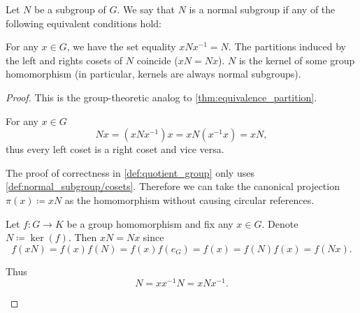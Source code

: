 \begin{definition}\label{def:normal_subgroup}
  Let \( N \) be a subgroup of \( G \). We say that \( N \) is a normal subgroup if any of the following equivalent conditions hold:
  \begin{defenum}
     For any \( x \in G \), we have the set equality \( x N x^{-1} = N \).
     The partitions induced by the left and rights cosets of \( N \) coincide (\( xN = Nx \)).
     \( N \) is the kernel of some group homomorphism (in particular, kernels are always normal subgroups).
  \end{defenum}
\end{definition}
\begin{proof}
  This is the group-theoretic analog to \cref{thm:equivalence_partition}.

  \begin{description}
     For any \( x \in G \)
    \begin{equation*}
      Nx = (xNx^{-1})x = xN(x^{-1}x) = xN,
    \end{equation*}
    thus every left coset is a right coset and vice versa.

     The proof of correctness in \cref{def:quotient_group} only uses \ref{def:normal_subgroup/cosets}. Therefore we can take the canonical projection \( \pi(x) \coloneqq xN \) as the homomorphism without causing circular references.

     Let \( f: G \to K \) be a group homomorphism and fix any \( x \in G \). Denote \( N \coloneqq \ker(f) \). Then \( xN = Nx \) since
    \begin{equation*}
      f(xN)
      =
      f(x) f(N)
      =
      f(x) f(e_G)
      =
      f(x)
      =
      f(N) f(x)
      =
      f(Nx).
    \end{equation*}

    Thus
    \begin{equation*}
      N = xx^{-1}N = xNx^{-1}.
    \end{equation*}
  \end{description}
\end{proof}

